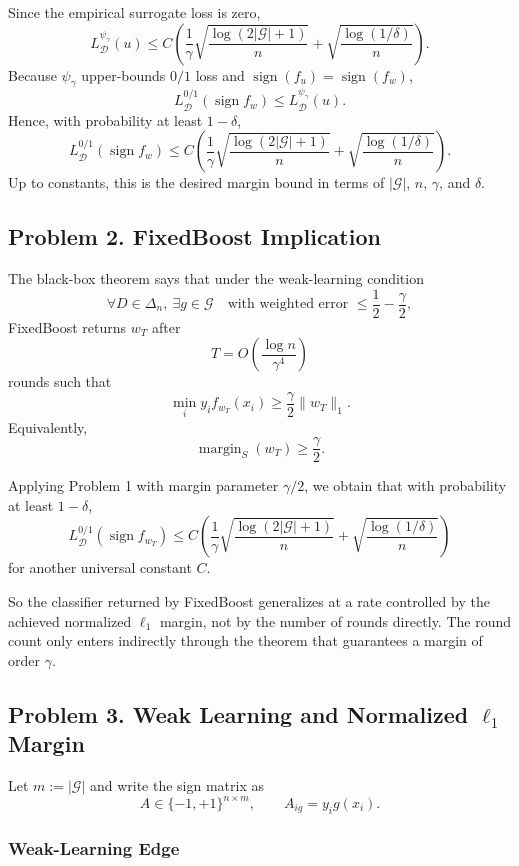 \documentclass{article}
\DeclareMathOperator{\sign}{sign}
\newcommand{\cD}{\mathcal{D}}
\newcommand{\cG}{\mathcal{G}}
\begin{document}
Since the empirical surrogate loss is zero,
$$
L_{\cD}^{\psi_\gamma}(u)
\le
C\left(
\frac{1}{\gamma}\sqrt{\frac{\log(2|\cG|+1)}{n}}
+
\sqrt{\frac{\log(1/\delta)}{n}}
\right).
$$
Because $\psi_\gamma$ upper-bounds $0/1$ loss and $\sign(f_u)=\sign(f_w)$,
$$
L_{\cD}^{0/1}(\sign f_w)
\le
L_{\cD}^{\psi_\gamma}(u).
$$
Hence, with probability at least $1-\delta$,
$$
L_{\cD}^{0/1}(\sign f_w)
\le
C\left(
\frac{1}{\gamma}\sqrt{\frac{\log(2|\cG|+1)}{n}}
+
\sqrt{\frac{\log(1/\delta)}{n}}
\right).
$$
Up to constants, this is the desired margin bound in terms of $|\cG|$, $n$, $\gamma$, and $\delta$.

\subsection{Problem 2. FixedBoost Implication}

The black-box theorem says that under the weak-learning condition
$$
\forall D\in\Delta_n,\ \exists g\in\cG
\quad
\text{with weighted error }
\le
\frac12-\frac{\gamma}{2},
$$
FixedBoost returns $w_T$ after
$$
T=O\!\left(\frac{\log n}{\gamma^4}\right)
$$
rounds such that
$$
\min_i y_i f_{w_T}(x_i)
\ge
\frac{\gamma}{2}\|w_T\|_1.
$$
Equivalently,
$$
\operatorname{margin}_S(w_T)\ge \frac{\gamma}{2}.
$$

Applying Problem 1 with margin parameter $\gamma/2$, we obtain that with probability at least $1-\delta$,
$$
L_{\cD}^{0/1}(\sign f_{w_T})
\le
C\left(
\frac{1}{\gamma}\sqrt{\frac{\log(2|\cG|+1)}{n}}
+
\sqrt{\frac{\log(1/\delta)}{n}}
\right)
$$
for another universal constant $C$.

So the classifier returned by FixedBoost generalizes at a rate controlled by the achieved normalized $\ell_1$ margin, not by the number of rounds directly. The round count only enters indirectly through the theorem that guarantees a margin of order $\gamma$.

\subsection{\texorpdfstring{Problem 3. Weak Learning and Normalized $\ell_1$ Margin}{Problem 3. Weak Learning and Normalized l1 Margin}}

Let $m:=|\cG|$ and write the sign matrix as
$$
A\in\{-1,+1\}^{n\times m},
\qquad
A_{ig}=y_i g(x_i).
$$

\subsubsection{Weak-Learning Edge}
\end{document}
